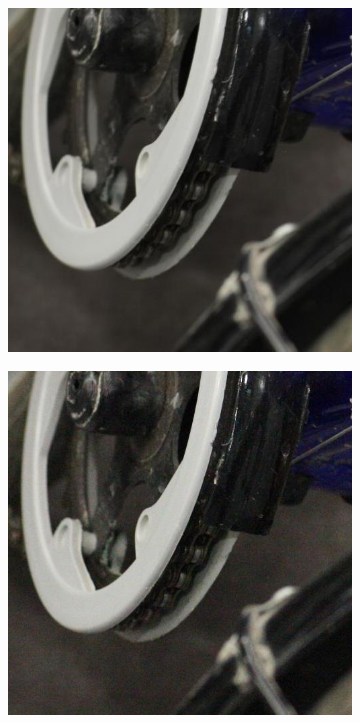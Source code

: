 \begin{figure}
\centering
    \begin{subfigure}[t]{0.24\textwidth}
        \centering
        \includegraphics[width=1\textwidth]{images/dataset/Canon5D2_5_160_6400_bicycle_6_mean.JPG}
    \end{subfigure}
\hfill
    \begin{subfigure}[t]{0.24\textwidth}
        \centering
        \includegraphics[width=1\textwidth]{images/dataset/Canon5D2_5_160_6400_bicycle_6_real.JPG}

\end{subfigure}
\end{figure}
